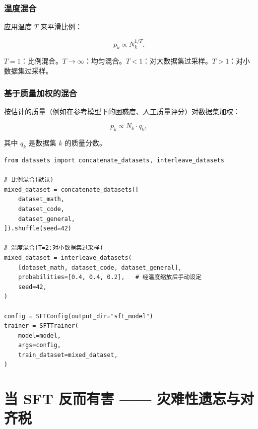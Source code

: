 \subsubsection*{温度混合}
\label{temperature-mixing}

应用温度 $T$ 来平滑比例：

\[
p_k \propto N_k^{1/T}.
\]

$T=1$：比例混合。$T \to \infty$：均匀混合。$T < 1$：对大数据集过采样。$T > 1$：对小数据集过采样。

\subsubsection*{基于质量加权的混合}
\label{quality-weighted-mixing}

按估计的质量（例如在参考模型下的困惑度、人工质量评分）对数据集加权：

\[
p_k \propto N_k \cdot q_k,
\]

其中 $q_k$ 是数据集 $k$ 的质量分数。

\begin{examplebox}
\begin{lstlisting}[style=pythonstyle]
from datasets import concatenate_datasets, interleave_datasets

# 比例混合(默认)
mixed_dataset = concatenate_datasets([
    dataset_math,
    dataset_code,
    dataset_general,
]).shuffle(seed=42)

# 温度混合(T=2:对小数据集过采样)
mixed_dataset = interleave_datasets(
    [dataset_math, dataset_code, dataset_general],
    probabilities=[0.4, 0.4, 0.2],   # 经温度缩放后手动设定
    seed=42,
)

config = SFTConfig(output_dir="sft_model")
trainer = SFTTrainer(
    model=model,
    args=config,
    train_dataset=mixed_dataset,
)
\end{lstlisting}
\end{examplebox}

\section{当 SFT 反而有害 —— 灾难性遗忘与对齐税}
\label{sec:sft-pitfalls}

